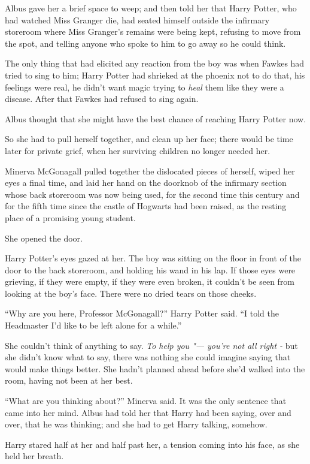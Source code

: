 Albus gave her a brief space to weep; and then told her that Harry
Potter, who had watched Miss Granger die, had seated himself outside the
infirmary storeroom where Miss Granger's remains were being kept,
refusing to move from the spot, and telling anyone who spoke to him to
go away so he could think.

The only thing that had elicited any reaction from the boy was when
Fawkes had tried to sing to him; Harry Potter had shrieked at the
phoenix not to do that, his feelings were real, he didn't want magic
trying to \emph{heal} them like they were a disease. After that Fawkes
had refused to sing again.

Albus thought that she might have the best chance of reaching Harry
Potter now.

So she had to pull herself together, and clean up her face; there would
be time later for private grief, when her surviving children no longer
needed her.

Minerva McGonagall pulled together the dislocated pieces of herself,
wiped her eyes a final time, and laid her hand on the doorknob of the
infirmary section whose back storeroom was now being used, for the
second time this century and for the fifth time since the castle of
Hogwarts had been raised, as the resting place of a promising young
student.

She opened the door.

Harry Potter's eyes gazed at her. The boy was sitting on the floor in
front of the door to the back storeroom, and holding his wand in his
lap. If those eyes were grieving, if they were empty, if they were even
broken, it couldn't be seen from looking at the boy's face. There were
no dried tears on those cheeks.

``Why are you here, Professor McGonagall?'' Harry Potter said. ``I told
the Headmaster I'd like to be left alone for a while.''

She couldn't think of anything to say. \emph{To help you "--- you're not
all right -} but she didn't know what to say, there was nothing she
could imagine saying that would make things better. She hadn't planned
ahead before she'd walked into the room, having not been at her best.

``What are you thinking about?'' Minerva said. It was the only sentence
that came into her mind. Albus had told her that Harry had been saying,
over and over, that he was thinking; and she had to get Harry talking,
somehow.

Harry stared half at her and half past her, a tension coming into his
face, as she held her breath.

